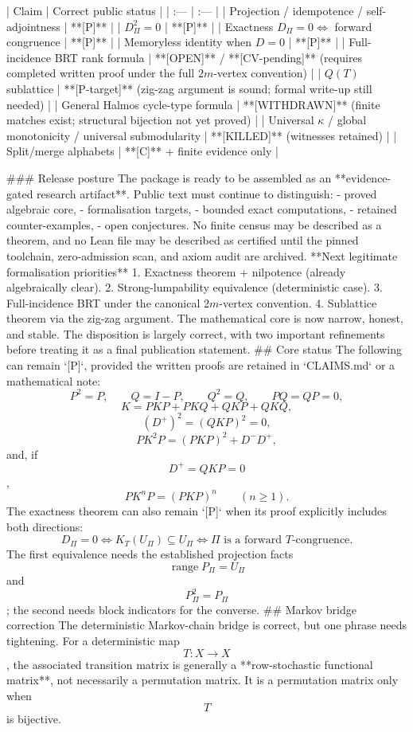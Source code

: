 | Claim | Correct public status |
| :--- | :--- |
| Projection / idempotence / self-adjointness | **[P]** |
| \(D_\Pi^2=0\) | **[P]** |
| Exactness \(D_\Pi=0\Leftrightarrow\) forward congruence | **[P]** |
| Memoryless identity when \(D=0\) | **[P]** |
| Full-incidence BRT rank formula | **[OPEN]** / **[CV-pending]** (requires completed written proof under the full \(2m\)-vertex convention) |
| \(Q(T)\) sublattice | **[P-target]** (zig-zag argument is sound; formal write-up still needed) |
| General Halmos cycle-type formula | **[WITHDRAWN]** (finite matches exist; structural bijection not yet proved) |
| Universal \(\kappa\) / global monotonicity / universal submodularity | **[KILLED]** (witnesses retained) |
| Split/merge alphabets | **[C]** + finite evidence only |

### Release posture
The package is ready to be assembled as an **evidence-gated research artifact**. Public text must continue to distinguish:
- proved algebraic core,
- formalisation targets,
- bounded exact computations,
- retained counter-examples,
- open conjectures.
No finite census may be described as a theorem, and no Lean file may be described as certified until the pinned toolchain, zero-admission scan, and axiom audit are archived.
**Next legitimate formalisation priorities**
1. Exactness theorem + nilpotence (already algebraically clear).  
2. Strong-lumpability equivalence (deterministic case).  
3. Full-incidence BRT under the canonical \(2m\)-vertex convention.  
4. Sublattice theorem via the zig-zag argument.
The mathematical core is now narrow, honest, and stable.
The disposition is largely correct, with two important refinements before treating it as a final publication statement.
## Core status
The following can remain `[P]`, provided the written proofs are retained in `CLAIMS.md` or a mathematical note:
$$
P^2=P,\qquad Q=I-P,\qquad Q^2=Q,\qquad PQ=QP=0,
$$
$$
K=PKP+PKQ+QKP+QKQ,
$$
$$
(D^+)^2=(QKP)^2=0,
$$
$$
PK^2P=(PKP)^2+D^-D^+,
$$
and, if $$D^+=QKP=0$$,
$$
PK^nP=(PKP)^n\qquad(n\ge1).
$$
The exactness theorem can also remain `[P]` when its proof explicitly includes both directions:
$$
D_\Pi=0
\iff
K_T(U_\Pi)\subseteq U_\Pi
\iff
\Pi\text{ is a forward }T\text{-congruence}.
$$
The first equivalence needs the established projection facts $$\operatorname{range}P_\Pi=U_\Pi$$ and $$P_\Pi^2=P_\Pi$$; the second needs block indicators for the converse.
## Markov bridge correction
The deterministic Markov-chain bridge is correct, but one phrase needs tightening.
For a deterministic map $$T:X\to X$$, the associated transition matrix is generally a **row-stochastic functional matrix**, not necessarily a permutation matrix. It is a permutation matrix only when $$T$$ is bijective.
